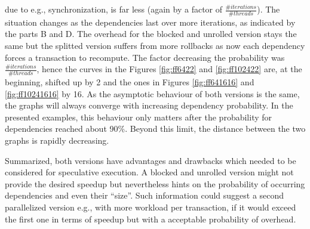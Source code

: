 due to e.g., synchronization, is far less 
(again by a factor of $\frac{\#iterations}{\#threads}$). 
The situation changes as the dependencies last over more iterations, as indicated
by the parts {\footnotesize B} and {\footnotesize D}. The overhead for the
blocked and unrolled version stays the same but the splitted version suffers from
more rollbacks as now each dependency forces a transaction to recompute. The 
factor decreasing the probability was $\frac{\#iterations}{\#threads}$,
hence the curves in the Figures \ref{fig:ff6422} and \ref{fig:ff102422} 
are, at the beginning, shifted up by 2 and the ones in Figures \ref{fig:ff641616}
and \ref{fig:ff10241616} by 16. As the asymptotic behaviour of both versions 
is the same, the graphs will always converge with increasing dependency probability.
In the presented examples, this behaviour only matters after the probability for dependencies
reached about 90\%. Beyond this limit, the distance between the two graphs is rapidly 
decreasing. 

Summarized, both versions have advantages and drawbacks which needed to be considered
for speculative execution. A blocked and unrolled version might not provide
the desired speedup but nevertheless hints on the probability of occurring dependencies
and even their ``size''. Such information could suggest a second parallelized 
version e.g., with more workload per transaction, if it would exceed the first
one in terms of speedup but with a acceptable probability of overhead.

